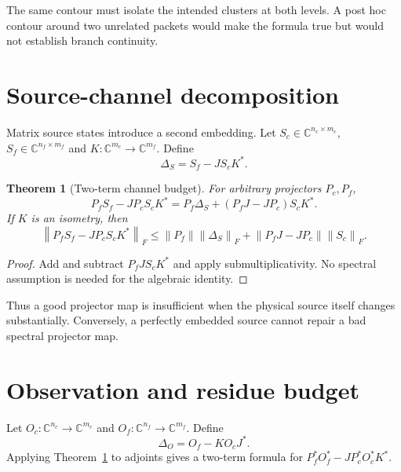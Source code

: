 \documentclass[12pt]{article}
\newtheorem{theorem}{Theorem}[section]
\theoremstyle{remark}\newtheorem{remark}[theorem]{Remark}
\newcommand{\norm}[1]{\left\lVert#1\right\rVert}
\newcommand{\C}{\mathbb C}
\begin{document}
The same contour must isolate the intended clusters at both levels.  A
post hoc contour around two unrelated packets would make the formula true
but would not establish branch continuity.

\section{Source-channel decomposition}

Matrix source states introduce a second embedding.  Let
$S_c\in\C^{n_c\times m_c}$, $S_f\in\C^{n_f\times m_f}$ and
$K:\C^{m_c}\to\C^{m_f}$.  Define
\begin{equation}\label{eq:source-defect}
 \Delta_S=S_f-JS_cK^*.
\end{equation}

\begin{theorem}[Two-term channel budget]\label{thm:channel}
For arbitrary projectors $P_c,P_f$,
\begin{equation}\label{eq:channel-identity}
 P_fS_f-JP_cS_cK^*
 =P_f\Delta_S+(P_fJ-JP_c)S_cK^*.
\end{equation}
If $K$ is an isometry, then
\begin{equation}\label{eq:channel-bound}
 \norm{P_fS_f-JP_cS_cK^*}_F
 \le \norm{P_f}\norm{\Delta_S}_F
 +\norm{P_fJ-JP_c}\norm{S_c}_F.
\end{equation}
\end{theorem}

\begin{proof}
Add and subtract $P_fJS_cK^*$ and apply submultiplicativity.  No spectral
assumption is needed for the algebraic identity.
\end{proof}

Thus a good projector map is insufficient when the physical source itself
changes substantially.  Conversely, a perfectly embedded source cannot
repair a bad spectral projector map.

\section{Observation and residue budget}

Let $O_c:\C^{n_c}\to\C^{m_c}$ and
$O_f:\C^{n_f}\to\C^{m_f}$.  Define
\begin{equation}\label{eq:obs-defect}
 \Delta_O=O_f-KO_cJ^*.
\end{equation}
Applying Theorem~\ref{thm:channel} to adjoints gives a two-term formula for
$P_f^*O_f^*-JP_c^*O_c^*K^*$.
\end{document}
